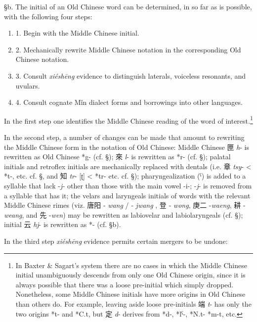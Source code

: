 §b. The initial of an Old Chinese word can be determined, in so far as
is possible, with the following four steps:

\begin{enumerate}
\item 1. Begin with the Middle Chinese initial.
\item 2. Mechanically rewrite Middle Chinese notation in the corresponding Old
Chinese notation.
\item 3. Consult  \emph{xiéshēng} evidence to distinguish laterals, voiceless
resonants, and uvulars.
\item 4. Consult cognate Mǐn dialect forms and borrowings into other
languages.
\end{enumerate}

In the first step one identifies the Middle Chinese reading of the word
of interest.\footnote{In Baxter \& Sagart's system there are no cases in
  which the Middle Chinese initial unambiguously descends from only one
  Old Chinese origin, since it is always possible that there was a loose
  pre-initial which simply dropped. Nonetheless, some Middle Chinese
  initials have more origins in Old Chinese than others do. For example,
  leaving aside loose pre-initials 端 \emph{t}- has only the two origins
  *t- and *C.t, but 定 \emph{d}- derives from *d-, *lˁ-, *N.t- *m-t,
  etc. }

In the second step, a number of changes can be made that amount to
rewriting the Middle Chinese form in the notation of Old Chinese: Middle
Chinese 匣 \emph{h}- is rewritten as Old Chinese *g- (cf. §); 來
\emph{l}- is rewritten as *r- (cf. §); palatal initials and retroflex
initials are mechanically replaced with dentals (i.e. 章 \emph{tsy}-
\textless{} *t-, etc. cf. §, and 知 \emph{tr}- {[}ʈ] \textless{} *tr-
etc. cf. §); pharyngealization (ˁ) is added to a syllable that lack
-\emph{j- }other than those with the main vowel -i-; -\emph{j}- is
removed from a syllable that has it; the velars and laryngeals initials
of words with the relevant Middle Chinese rimes (viz. 唐阳 ‑ \emph{wang}
/ ‑ \emph{jwang} , 登 ‑ \emph{wong}, 庚二 -\emph{waeng}, 耕 -\emph{weang},
and 先 -\emph{wen}) may be rewritten as labiovelar and labiolaryngeals
(cf. §); initial 云 \emph{hj}- is rewritten as *{}- (cf. §b).

In the third step  \emph{xiéshēng} evidence permits certain mergers to be
undone:

